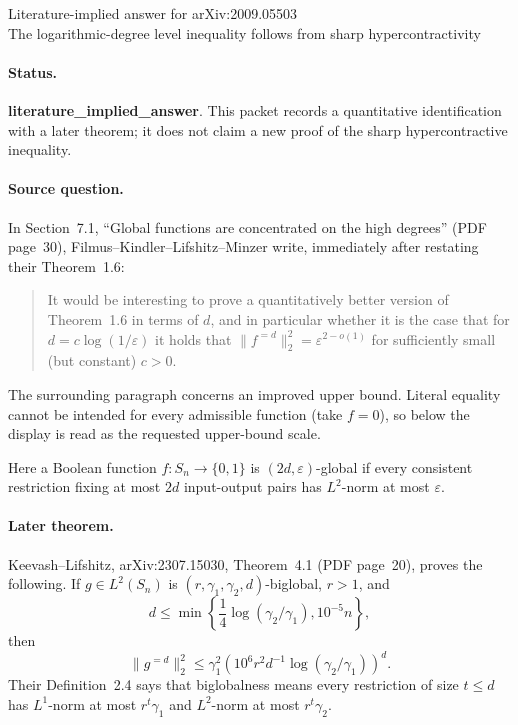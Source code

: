 \documentclass[11pt]{article}
\begin{document}
\begin{center}
{\Large Literature-implied answer for arXiv:2009.05503}\\[4pt]
{\large The logarithmic-degree level inequality follows from sharp
hypercontractivity}
\end{center}

\paragraph{Status.}
\textbf{literature\_implied\_answer}. This packet records a quantitative
identification with a later theorem; it does not claim a new proof of the
sharp hypercontractive inequality.

\paragraph{Source question.}
In Section~7.1, ``Global functions are concentrated on the high degrees''
(PDF page~30), Filmus--Kindler--Lifshitz--Minzer write, immediately after
restating their Theorem~1.6:
\begin{quote}
It would be interesting to prove a quantitatively better version of
Theorem~1.6 in terms of $d$, and in particular whether it is the case that for
$d=c\log(1/\varepsilon)$ it holds that
$\lVert f^{=d}\rVert_2^2=\varepsilon^{2-o(1)}$ for sufficiently small (but
constant) $c>0$.
\end{quote}
The surrounding paragraph concerns an improved upper bound. Literal equality
cannot be intended for every admissible function (take $f=0$), so below the
display is read as the requested upper-bound scale.

Here a Boolean function $f:S_n\to\{0,1\}$ is
$(2d,\varepsilon)$-global if every consistent restriction fixing at most
$2d$ input-output pairs has $L^2$-norm at most $\varepsilon$.

\paragraph{Later theorem.}
Keevash--Lifshitz, arXiv:2307.15030, Theorem~4.1 (PDF page~20), proves the
following. If $g\in L^2(S_n)$ is
$(r,\gamma_1,\gamma_2,d)$-biglobal, $r>1$, and
\[
d\leq\min\left\{\frac14\log(\gamma_2/\gamma_1),10^{-5}n\right\},
\]
then
\[
 \lVert g^{=d}\rVert_2^2
 \leq \gamma_1^2
 \left(10^6r^2d^{-1}\log(\gamma_2/\gamma_1)\right)^d.
\]
Their Definition~2.4 says that biglobalness means every restriction of size
$t\leq d$ has $L^1$-norm at most $r^t\gamma_1$ and $L^2$-norm at most
$r^t\gamma_2$.
\end{document}

